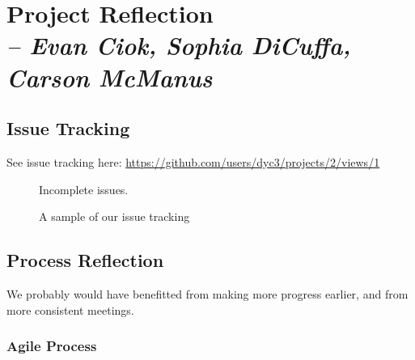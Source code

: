 \chapter{Project Reflection \\
  \small{\textit{-- Evan Ciok, Sophia DiCuffa, Carson McManus}}
  \label{Chapter::ProjectReflection}}

\section{Issue Tracking}

See issue tracking here: \href{https://github.com/users/dyc3/projects/2/views/1}{https://github.com/users/dyc3/projects/2/views/1}

\begin{figure}
	\centering
	\caption{\label{Figure::gh-incomplete} Incomplete issues.}
\end{figure}

\begin{figure}
	\centering
	\caption{\label{Figure::gh-issue-sample.png} A sample of our issue tracking}
\end{figure}

\section{Process Reflection}

We probably would have benefitted from making more progress earlier, and from more consistent meetings.

\subsection{Agile Process}

